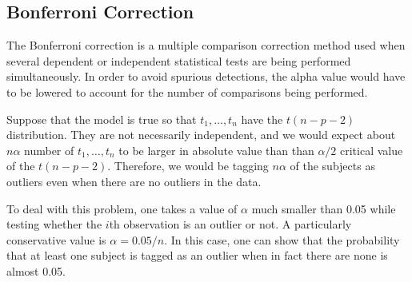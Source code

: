 \subsection{Bonferroni Correction}

The Bonferroni correction is a multiple comparison correction method used when
several dependent or independent statistical tests are being performed simultaneously.
In order to avoid spurious detections, the alpha value would have to be 
lowered to account for the number of comparisons being performed.

Suppose that the model is true so that $t_{1}, \ldots, t_{n}$ have the $t(n-p-2)$
distribution. They are not necessarily independent, and we would expect about
$n \alpha$ number of $t_{1}, \ldots, t_{n}$ to be larger in absolute value than 
than $\alpha/2$ critical value of the $t(n-p-2)$. Therefore, we would be tagging 
$n \alpha$ of the subjects as outliers even when there are no outliers in the 
data.

To deal with this problem, one takes a value of $\alpha$ much smaller than 0.05 while 
testing whether the $i$th observation is an outlier or not. A particularly conservative 
value is $\alpha = 0.05/n$. In this case, one can show that the probability that at 
least one subject is tagged as an outlier when in fact there are none is almost 0.05. 
